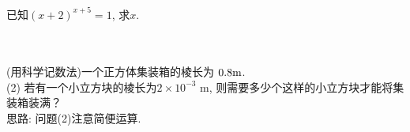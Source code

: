 \item {
    已知$(x+2)^{x+5}=1$, 求$x$.
}
\\ \\ \\

\item {
    (用科学记数法)一个正方体集装箱的棱长为 $0.8 \rm{m}$.\\
    (2) 若有一个小立方块的棱长为$2\times 10^{-3} $ m, 则需要多少个这样的小立方块才能将集装箱装满？
    \ifshowSolution
    \fangsong{}
    \\
    思路: 问题(2)注意简便运算.
    \else
        \\ \\ \\
    \fi
}